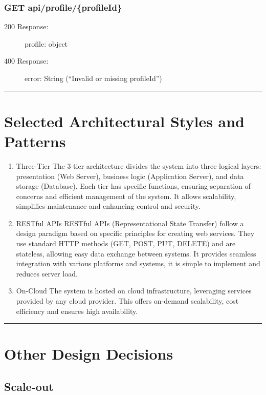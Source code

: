 \documentclass{Configuration_Files/Template}
\begin{document}
\subsubsection{GET api/profile/\{profileId\}}
\begin{description}
    
    \item[200 Response:] profile: object
    \item[400 Response:] error: String (“Invalid or missing profileId”)
\end{description}

{\color{bluepoli}\rule{\linewidth}{0.1pt}}

\section{Selected Architectural Styles and Patterns}

\begin{enumerate}
    \item \textcolor{bluepoli}{Three-Tier} The 3-tier architecture divides the system into three logical layers: presentation (Web Server), business logic (Application Server), and data storage (Database). Each tier has specific functions, ensuring separation of concerns and efficient management of the system. It allows scalability, simplifies maintenance and enhancing control and security. 
    \item \textcolor{bluepoli}{RESTful APIs} RESTful APIs (Representational State Transfer) follow a design paradigm based on specific principles for creating web services. They use standard HTTP methods (GET, POST, PUT, DELETE) and are stateless, allowing easy data exchange between systems. It provides seamless integration with various platforms and systems, it is simple to implement and reduces server load.
    \item \textcolor{bluepoli}{On-Cloud} The system is hosted on cloud infrastructure, leveraging services provided by any cloud provider. This offers on-demand scalability, cost efficiency and ensures high availability.
\end{enumerate}

{\color{bluepoli}\rule{\linewidth}{0.1pt}}

\section{Other Design Decisions}

\subsection{Scale-out} 
\end{document}
